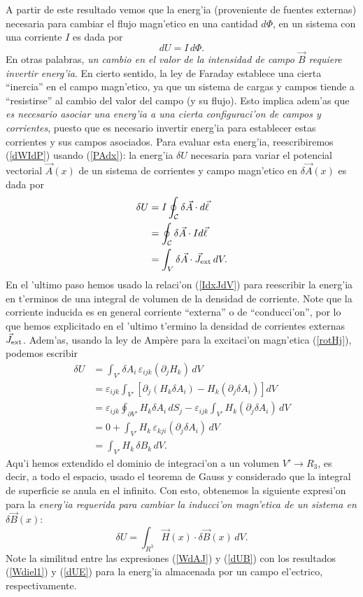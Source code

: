 A partir de este resultado vemos que la energ'ia (proveniente de fuentes externas) necesaria para cambiar el flujo magn'etico en una cantidad $d\Phi$, en un sistema con una corriente $I$ es dada por
\begin{equation}\label{dWIdP}
 \boxed{dU=I\,d\Phi.}
\end{equation}
En otras palabras, \textit{un cambio en el valor de la intensidad de campo $\vec{B}$ requiere invertir energ'ia}. En cierto sentido, la ley de Faraday establece una cierta ``inercia'' en el campo magn'etico, ya que un sistema de cargas y campos tiende a ``resistirse'' al cambio del valor del campo (y su flujo). 
Esto implica adem'as que \textit{es necesario asociar una energ'ia a una cierta configuraci'on de campos y corrientes}, puesto que es necesario invertir energ'ia para establecer estas corrientes y sus campos asociados. Para evaluar esta energ'ia, reescribiremos (\ref{dWIdP}) usando (\ref{PAdx}): la energ'ia $\delta U$ necesaria para variar el potencial vectorial $\vec{A}(x)$ de un sistema de corrientes y campo magn'etico en $\delta\vec{A}(x)$ es dada por
\begin{align}
 \delta U &= I\oint_{\cal C}\delta\vec{A}\cdot d\vec{\ell} \\
 &= \oint_{\cal C}\delta\vec{A}\cdot Id\vec{\ell} \\
 &= \int_V\delta\vec{A}\cdot \vec{J}_{\rm ext}\,dV. \label{WdAJ}
\end{align}
En el 'ultimo paso hemos usado la relaci'on (\ref{IdxJdV}) para reescribir la energ'ia en t'erminos de una integral de volumen de la densidad de corriente. Note que la corriente inducida es en general corriente ``externa'' o de ``conducci'on'', por lo que hemos explicitado en el 'ultimo t'ermino la densidad de corrientes externas $\vec{J}_{\rm ext}$. Adem'as, usando la ley de Amp\`ere para la excitaci'on magn'etica (\ref{rotHj}), podemos escribir
\begin{align}
 \delta U 
&= \int_{V'} \delta A_i\,\varepsilon_{ijk}\left(\partial_jH_k\right)\,dV \\
&= \varepsilon_{ijk}\int_{V'} \left[\partial_j(H_k\delta A_i)-H_k(\partial_j\delta A_i)\right]dV\\
&= \varepsilon_{ijk}\oint_{\partial V'}H_k\delta
A_i\,dS_j-\varepsilon_{ijk}\int_{V'}H_k(\partial_j\delta A_i)\,dV\\
&= 0+\int_{V'} H_k\,\varepsilon_{kji}(\partial_j\delta A_i)\,dV\\
&= \int_{V'} H_k\,\delta B_k\,dV.
\end{align}
Aqu'i hemos extendido el dominio de integraci'on a un volumen $V'\to R_3$, es decir, a todo el espacio, usado el teorema de Gauss y considerado que la integral de superficie se anula en el infinito. Con esto, obtenemos la siguiente expresi'on para la \textit{energ'ia requerida para cambiar la inducci'on magn'etica de un sistema en $\delta{\vec B}(x)$}:
\begin{equation}
 \boxed{\delta U=\int_{R^3} \vec{H}(x)\cdot \delta\vec{B}(x)\,dV.}\label{dUB}
\end{equation}
Note la similitud entre las expresiones (\ref{WdAJ}) y (\ref{dUB}) con los resultados (\ref{Wdiel1}) y (\ref{dUE}) para la energ'ia almacenada por un campo el'ectrico, respectivamente.

